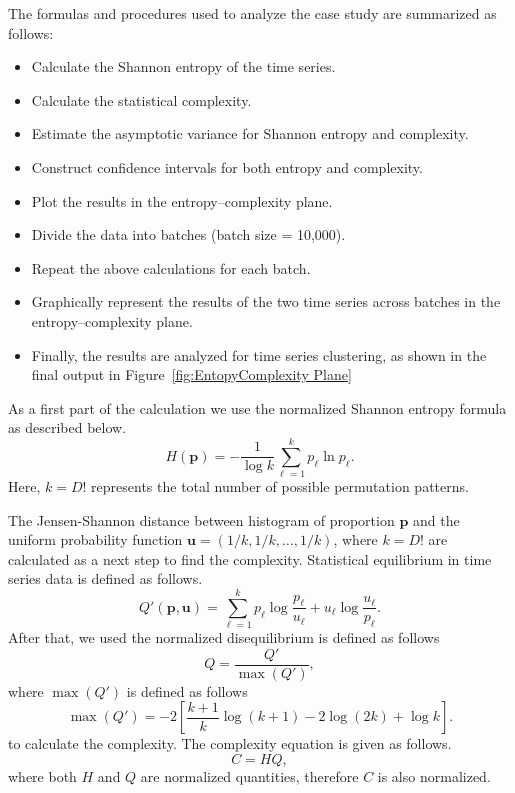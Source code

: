 The formulas and procedures used to analyze the case study are summarized as follows:
\begin{itemize}
	\item Calculate the Shannon entropy of the time series.
	\item Calculate the statistical complexity.
	\item Estimate the asymptotic variance for Shannon entropy and complexity.
	\item Construct confidence intervals for both entropy and complexity.
	\item Plot the results in the entropy–complexity plane.
	\item Divide the data into batches (batch size = 10,000).
	\item Repeat the above calculations for each batch.
	\item Graphically represent the results of the two time series across batches in the entropy–complexity plane.
	\item Finally, the results are analyzed for time series clustering, as shown in the final output in Figure~\ref{fig:EntopyComplexity Plane}
\end{itemize}


As a first part of the calculation we use the normalized Shannon entropy formula as described below. 
\begin{equation}
	H(\mathbf{p})=-\dfrac{1}{\log k}\sum^{k}_{\ell=1}p_{\ell} \ln{p_{\ell}}.
\end{equation}
Here, $k=D!$ represents the total number of possible permutation patterns.

The Jensen-Shannon distance between histogram of proportion $\mathbf{p}$ and the uniform probability function $\mathbf{u}=(1/k, 1/k, \dots, 1/k)$, where $k=D!$ are calculated as a next step to find the complexity. 
Statistical equilibrium in time series data is defined as follows. 
\begin{equation}
	Q'(\mathbf{p,u})=\sum^k_{\ell=1} p_\ell\log\dfrac{p_\ell}{u_\ell}+u_\ell\log\dfrac{u_\ell}{p_\ell}.
\end{equation}
After that, we used the normalized disequilibrium is defined as follows
\begin{equation}
	Q=\dfrac{Q'}{\max{(Q')}},
\end{equation}
where $\max(Q')$ is defined as follows
\begin{equation}
	\max(Q')=-2 \left[\dfrac{k+1}{k}\log(k+1)-2\log(2k)+\log k\right].
\end{equation}
to calculate the complexity.
The complexity equation is given as follows.
\begin{equation}
	C=HQ,
\end{equation}
where both $H$ and $Q$ are normalized quantities, therefore $C$ is also normalized.   

